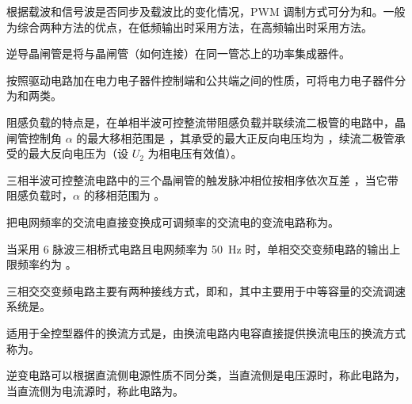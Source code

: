 \documentclass[电力电子]{subfiles}
\begin{document}
\begin{ti}
	根据载波和信号波是否同步及载波比的变化情况，PWM 调制方式可分为和。一般为综合两种方法的优点，在低频输出时采用方法，在高频输出时采用方法。
\end{ti}

\begin{ti}
	逆导晶闸管是将与晶闸管（如何连接）在同一管芯上的功率集成器件。
\end{ti}

\begin{ti}
	按照驱动电路加在电力电子器件控制端和公共端之间的性质，可将电力电子器件分为和两类。
\end{ti}

\begin{ti}
	阻感负载的特点是，在单相半波可控整流带阻感负载并联续流二极管的电路中，晶闸管控制角 $\alpha$ 的最大移相范围是 ，其承受的最大正反向电压均为 ，续流二极管承受的最大反向电压为（设 $U_{2}$ 为相电压有效值）。
\end{ti}

\begin{ti}
	三相半波可控整流电路中的三个晶闸管的触发脉冲相位按相序依次互差 ，当它带阻感负载时，$\alpha$ 的移相范围为 。
\end{ti}

\begin{ti}
	把电网频率的交流电直接变换成可调频率的交流电的变流电路称为。
\end{ti}

\begin{ti}
	当采用 6 脉波三相桥式电路且电网频率为 \SI{50}{Hz} 时，单相交交变频电路的输出上限频率约为 。
\end{ti}

\begin{ti}
	三相交交变频电路主要有两种接线方式，即和，其中主要用于中等容量的交流调速系统是。
\end{ti}

\begin{ti}
	适用于全控型器件的换流方式是，由换流电路内电容直接提供换流电压的换流方式称为。
\end{ti}

\begin{ti}
	逆变电路可以根据直流侧电源性质不同分类，当直流侧是电压源时，称此电路为，当直流侧为电流源时，称此电路为。
\end{ti}
\end{document}

